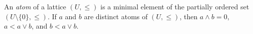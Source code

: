 An \textit{atom} of a lattice $(U, \leq)$ is a minimal element of the partially ordered set $(U \setminus \{0\}, \leq)$. If $a$ and $b$ are distinct atoms of $(U, \leq)$, then $a \wedge b = 0$, $a < a \vee b$, and $b < a \vee b$.
